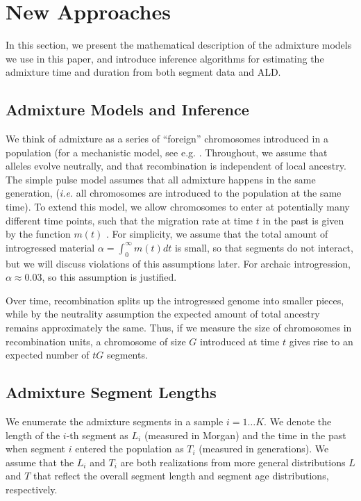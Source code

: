 \documentclass[11pt]{article}
\begin{document}
\section{New Approaches}\label{new approaches}

In this section, we present the mathematical description of the admixture models we use in this paper, and introduce inference algorithms for estimating the admixture time and duration from both segment data and ALD. 


\subsection{Admixture Models and Inference}\label{admixture models}
	
We think of admixture as a series of ``foreign'' chromosomes introduced in a population (for a mechanistic model, see e.g. \cite{pool_inference_2009}. Throughout, we assume that alleles evolve neutrally, and that recombination is independent of local ancestry. The simple pulse model assumes that all admixture happens in the same generation, (\textit{i.e.} all chromosomes are introduced to the population at the same time). To extend this model, we allow chromosomes to enter at potentially many different time points, such that the migration rate at time $t$ in the past is given by the function $m(t)$ \citep{pool_inference_2009, ni_length_2016}. For simplicity, we assume that the total amount of introgressed material $\alpha=\int_0^\infty m(t)dt$ is small, so that segments do not interact, but we will discuss violations of this assumptions later. For archaic introgression, $\alpha \approx 0.03$, so this assumption is justified. 

Over time, recombination splits up the introgressed genome into smaller pieces, while by the neutrality assumption the expected amount of total ancestry remains approximately the same. Thus, if we measure the size of chromosomes in recombination units, a chromosome of size $G$ introduced at time $t$ gives rise to an expected number of $tG$ segments.


\subsection{Admixture Segment Lengths}
We enumerate the admixture segments in a sample $i=1\dots K$. We denote the length of the $i$-th segment as $L_i$ (measured in Morgan) and the time in the past when segment $i$ entered the population as $T_i$ (measured in generations). We assume that the $L_i$ and $T_i$ are both realizations from more general distributions $L$ and $T$ that reflect the overall segment length and segment age distributions, respectively. 
\end{document}
